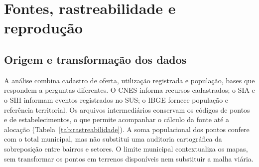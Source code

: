 \appendix
\chapter{Fontes, rastreabilidade e reprodução}\label{ap:reproducao}

\section{Origem e transformação dos dados}
A análise combina cadastro de oferta, utilização registrada e população, bases que respondem a perguntas
diferentes. O CNES informa recursos cadastrados; o SIA e o SIH informam eventos registrados no SUS; o
IBGE fornece população e referência territorial. Os arquivos intermediários conservam os códigos de
pontos e de estabelecimentos, o que permite acompanhar o cálculo da fonte até a alocação
(Tabela~\ref{tab:rastreabilidade}). A soma populacional dos pontos confere com o total municipal, mas
não substitui uma auditoria cartográfica da sobreposição entre bairros e setores. O limite municipal
contextualiza os mapas, sem transformar os pontos em terrenos disponíveis nem substituir a malha viária.

